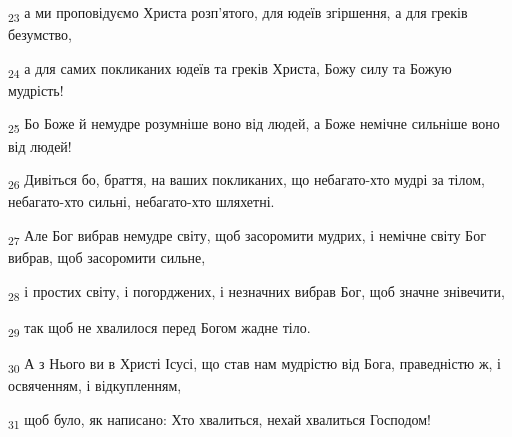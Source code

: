 \begin{tcolorbox}
\textsubscript{23} а ми проповідуємо Христа розп'ятого, для юдеїв згіршення, а для греків безумство,
\end{tcolorbox}
\begin{tcolorbox}
\textsubscript{24} а для самих покликаних юдеїв та греків Христа, Божу силу та Божую мудрість!
\end{tcolorbox}
\begin{tcolorbox}
\textsubscript{25} Бо Боже й немудре розумніше воно від людей, а Боже немічне сильніше воно від людей!
\end{tcolorbox}
\begin{tcolorbox}
\textsubscript{26} Дивіться бо, браття, на ваших покликаних, що небагато-хто мудрі за тілом, небагато-хто сильні, небагато-хто шляхетні.
\end{tcolorbox}
\begin{tcolorbox}
\textsubscript{27} Але Бог вибрав немудре світу, щоб засоромити мудрих, і немічне світу Бог вибрав, щоб засоромити сильне,
\end{tcolorbox}
\begin{tcolorbox}
\textsubscript{28} і простих світу, і погорджених, і незначних вибрав Бог, щоб значне знівечити,
\end{tcolorbox}
\begin{tcolorbox}
\textsubscript{29} так щоб не хвалилося перед Богом жадне тіло.
\end{tcolorbox}
\begin{tcolorbox}
\textsubscript{30} А з Нього ви в Христі Ісусі, що став нам мудрістю від Бога, праведністю ж, і освяченням, і відкупленням,
\end{tcolorbox}
\begin{tcolorbox}
\textsubscript{31} щоб було, як написано: Хто хвалиться, нехай хвалиться Господом!
\end{tcolorbox}
